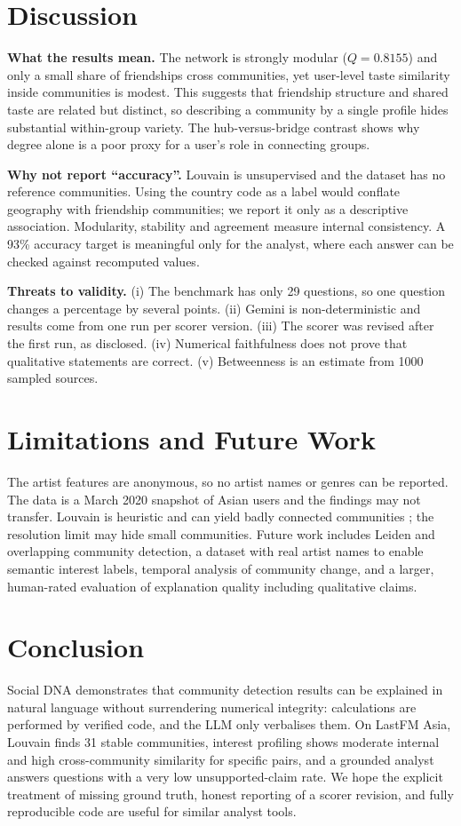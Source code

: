 \documentclass[conference]{IEEEtran}
\begin{document}
\section{Discussion}\label{sec:disc}
\textbf{What the results mean.} The network is strongly modular ($Q=0.8155$) and only a small share of friendships cross communities, yet user-level taste similarity inside communities is modest. This suggests that friendship structure and shared taste are related but distinct, so describing a community by a single profile hides substantial within-group variety. The hub-versus-bridge contrast shows why degree alone is a poor proxy for a user's role in connecting groups.

\textbf{Why not report ``accuracy''.} Louvain is unsupervised and the dataset has no reference communities. Using the country code as a label would conflate geography with friendship communities; we report it only as a descriptive association. Modularity, stability and agreement measure internal consistency. A 93\% accuracy target is meaningful only for the analyst, where each answer can be checked against recomputed values.

\textbf{Threats to validity.} (i) The benchmark has only 29 questions, so one question changes a percentage by several points. (ii) Gemini is non-deterministic and results come from one run per scorer version. (iii) The scorer was revised after the first run, as disclosed. (iv) Numerical faithfulness does not prove that qualitative statements are correct. (v) Betweenness is an estimate from 1000 sampled sources.

\section{Limitations and Future Work}
The artist features are anonymous, so no artist names or genres can be reported. The data is a March 2020 snapshot of Asian users and the findings may not transfer. Louvain is heuristic and can yield badly connected communities \cite{traag2019}; the resolution limit \cite{fortunato2007} may hide small communities. Future work includes Leiden and overlapping community detection, a dataset with real artist names to enable semantic interest labels, temporal analysis of community change, and a larger, human-rated evaluation of explanation quality including qualitative claims.

\section{Conclusion}\label{sec:conc}
Social DNA demonstrates that community detection results can be explained in natural language without surrendering numerical integrity: calculations are performed by verified code, and the LLM only verbalises them. On LastFM Asia, Louvain finds 31 stable communities, interest profiling shows moderate internal and high cross-community similarity for specific pairs, and a grounded analyst answers questions with a very low unsupported-claim rate. We hope the explicit treatment of missing ground truth, honest reporting of a scorer revision, and fully reproducible code are useful for similar analyst tools.
\end{document}

